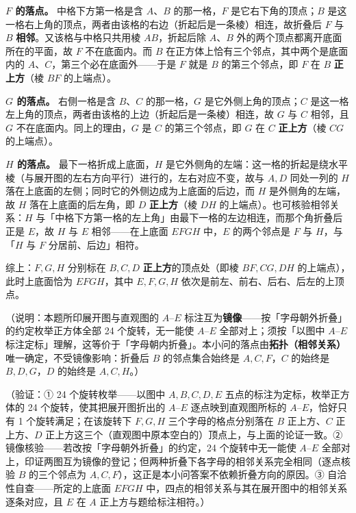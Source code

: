\begin{answer}
\textbf{\(F\) 的落点。} 中格下方第一格是含 \(A\)、\(B\) 的那一格，\(F\) 是它右下角的顶点；\(B\) 是这一格右上角的顶点，两者由该格的右边（折起后是一条棱）相连，故折叠后 \(F\) 与 \(B\) \textbf{相邻}。又该格与中格只共用棱 \(AB\)，折起后除 \(A\)、\(B\) 外的两个顶点都离开底面所在的平面，故 \(F\) 不在底面内。而 \(B\) 在正方体上恰有三个邻点，其中两个是底面内的 \(A\)、\(C\)，第三个必在底面外——于是 \(F\) 就是 \(B\) 的第三个邻点，即 \(F\) 在 \(B\) \textbf{正上方}（棱 \(BF\) 的上端点）。

\textbf{\(G\) 的落点。} 右侧一格是含 \(B\)、\(C\) 的那一格，\(G\) 是它外侧上角的顶点；\(C\) 是这一格左上角的顶点，两者由该格的上边（折起后是一条棱）相连，故 \(G\) 与 \(C\) 相邻，且 \(G\) 不在底面内。同上的理由，\(G\) 是 \(C\) 的第三个邻点，即 \(G\) 在 \(C\) \textbf{正上方}（棱 \(CG\) 的上端点）。

\textbf{\(H\) 的落点。} 最下一格折成上底面，\(H\) 是它外侧角的左端：这一格的折起是绕水平棱（与展开图的左右方向平行）进行的，左右对应不变，故与 \(A,D\) 同处一列的 \(H\) 落在上底面的左侧；同时它的外侧边成为上底面的后边，而 \(H\) 是外侧角的左端，故 \(H\) 落在上底面的后左角，即 \(D\) \textbf{正上方}（棱 \(DH\) 的上端点）。也可核验相邻关系：\(H\) 与「中格下方第一格的左上角」由最下一格的左边相连，而那个角折叠后正是 \(E\)，故 \(H\) 与 \(E\) 相邻——在上底面 \(EFGH\) 中，\(E\) 的两个邻点是 \(F\) 与 \(H\)，与「\(H\) 与 \(F\) 分居前、后边」相符。

综上：\(F,G,H\) 分别标在 \(B,C,D\) \textbf{正上方}的顶点处（即棱 \(BF,CG,DH\) 的上端点），此时上底面恰为 \(EFGH\)，其中 \(E,F,G,H\) 依次是前左、前右、后右、后左的上顶点。

（说明：本题所印展开图与直观图的 \(A\)–\(E\) 标注互为\textbf{镜像}——按「字母朝外折叠」的约定枚举正方体全部 24 个旋转，无一能使 \(A\)–\(E\) 全部对上；须按「以图中 \(A\)–\(E\) 标注定标」理解，这等价于「字母朝内折叠」。本小问的落点由\textbf{拓扑（相邻关系）}唯一确定，不受镜像影响：折叠后 \(B\) 的邻点集合始终是 \(A,C,F\)，\(C\) 的始终是 \(B,D,G\)，\(D\) 的始终是 \(A,C,H\)。）

（验证：① 24 个旋转枚举——以图中 \(A,B,C,D,E\) 五点的标注为定标，枚举正方体的 24 个旋转，使其把展开图折出的 \(A\)–\(E\) 逐点映到直观图所标的 \(A\)–\(E\)，恰好只有 1 个旋转满足；在该旋转下 \(F,G,H\) 三个字母的格点分别落在 \(B\) 正上方、\(C\) 正上方、\(D\) 正上方这三个（直观图中原本空白的）顶点上，与上面的论证一致。② 镜像核验——若改按「字母朝外折叠」的约定，24 个旋转中无一能使 \(A\)–\(E\) 全部对上，印证两图互为镜像的登记；但两种折叠下各字母的相邻关系完全相同（逐点核验 \(B\) 的三个邻点为 \(A,C,F\)），这正是本小问答案不依赖折叠方向的原因。③ 自洽性自查——所定的上底面 \(EFGH\) 中，四点的相邻关系与其在展开图中的相邻关系逐条对应，且 \(E\) 在 \(A\) 正上方与题给标注相符。）


\end{answer}
